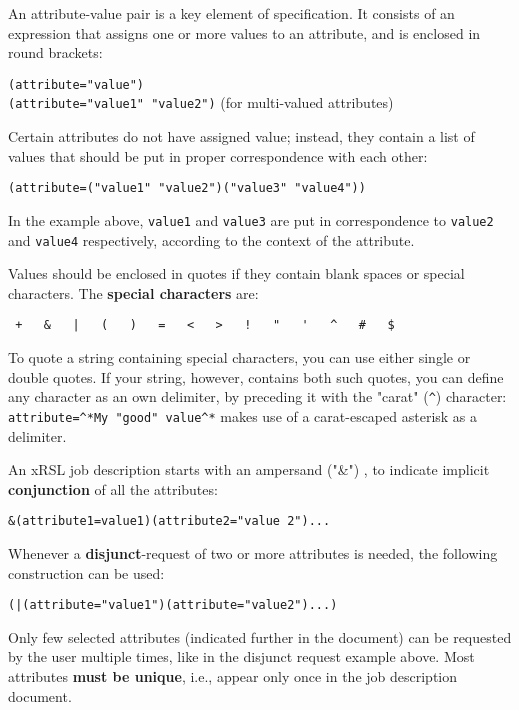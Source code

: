 \documentclass{book}
\begin{document}
  An attribute-value pair is a key element of specification. It
  consists of an expression that assigns one or more values to an
  attribute, and is enclosed in round brackets:

  \begin{shaded}
    \verb#(attribute="value")#\\
    \verb#(attribute="value1" "value2")# (for multi-valued attributes)
  \end{shaded}

  Certain attributes do not have assigned value; instead, they contain
  a list of values that should be put in proper correspondence with
  each other:

  \begin{shaded}
    \verb#(attribute=("value1" "value2")("value3" "value4"))#
  \end{shaded}

  In the example above, \verb#value1# and \verb#value3# are put in correspondence to
  \verb#value2# and \verb#value4# respectively, according to the
  context of the attribute.

  Values should be enclosed in quotes if they contain blank
  spaces or special characters. The \textbf{special characters} are:
  \begin{shaded}
    \verb. +   &   |   (   )   =   <   >   !   "   '   ^   #   $.%
  \end{shaded}

  To quote a string containing special characters, you can use
  either single or double quotes. If your string, however, contains
  both such quotes, you can define any character as an own
  delimiter, by preceding it with the "carat" (\verb#^#) character:
  \verb#attribute=^*My "good" value^*# makes use of a carat-escaped
  asterisk as a delimiter.

  An xRSL job description starts with an ampersand
  ("\&") , to indicate implicit \textbf{conjunction} of all the
  attributes:
  \begin{shaded}
    \verb#&(attribute1=value1)(attribute2="value 2")...#
  \end{shaded}

  Whenever a \textbf{disjunct}-request of two or more attributes is
  needed, the following construction can be used:
  \begin{shaded}
    \verb#(|(attribute="value1")(attribute="value2")...)#
  \end{shaded}

  \begin{framed}
   Only few selected attributes (indicated further in the document) can be requested by the user multiple times, like in the disjunct request example above. Most attributes \textbf{must be unique}, i.e., appear only once in the job description document.
  \end{framed}
\end{document}
